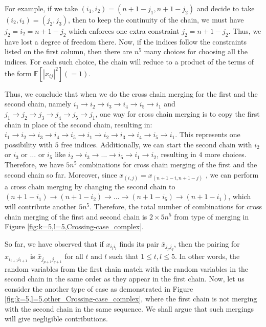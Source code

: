 \documentclass[12pt]{amsart}
\theoremstyle{plain}
\theoremstyle{definition}
\begin{document}
For example, if we take $(i_{1}, i_{2}) = (n+1 - j_{1}, n+1 - j_{2})$ and decide to take $(i_{2}, i_{3}) = (j_{2}, j_{3})$, then to keep the continuity of the chain, we must have $j_{2} = i_{2} = n+1 - j_{2}$ which enforces one extra constraint $j_{2} = n+1 - j_{2}$. Thus, we have lost a degree of freedom there. Now, if the indices follow the constraints listed on the first column, then there are $n^{5}$ many choices for choosing all the indices. For each such choice, the chain will reduce to a product of the terms of the form $\mathbb{E}[|x_{ij}|^{2}] (=1).$ 


Thus, we conclude that when we do the cross chain merging for the first and the second chain, namely $i_{1}\rightarrow i_{2}\rightarrow i_{3}\rightarrow i_{4}\rightarrow  i_{5}\to i_{1}$ and $j_{1}\rightarrow j_{2}\rightarrow j_{3}\rightarrow j_{4} \rightarrow j_{5}\to j_{1}$, one way for cross chain merging is to copy the first chain in place of the second chain, resulting in: $i_{1}\rightarrow i_{2}\rightarrow i_{3}\rightarrow i_{4}\rightarrow  i_{5}\to i_{1}\rightarrow i_{2}\rightarrow i_{3}\rightarrow i_{4}\rightarrow  i_{5}\to i_{1}$. This represents one possibility with $5$ free indices. Additionally, we can start the second chain with $i_{2}$ or $i_{3}$ or $\dots$ or $i_{5}$ like $i_{2}\rightarrow i_{3}\rightarrow \dots \rightarrow i_{5} \rightarrow i_{1}\rightarrow i_{2}$, resulting in $4$ more choices. Therefore, we have $5 n^{5}$ combinations for cross chain merging of the first and the second chain so far. Moreover, since $x_{(i,j)}=x_{(n+1-i,n+1-j)}$ , we can perform a cross chain merging by changing the second chain to $(n+1-i_{1})\rightarrow (n+1-i_{2})\rightarrow \dots \rightarrow (n+1-i_{5})\rightarrow (n+1-i_{1})$, which will contribute another $5n^{5}.$
Therefore, the total number of combinations for cross chain merging of the first and second chain is $2 \times 5n^{5}$ from type of merging in Figure \ref{fig:k=5,l=5,Crossing-case_complex}.

So far, we have observed that if $x_{i_ti_l}$ finds its pair $\bar{x}_{j_pj_q}$, then the pairing for $x_{i_{t+1}i_{l+1}}$ is $\bar{x}_{j_{p+1}j_{q+1}}$ for all $t$ and $l$ such that $1 \leq t, l \leq 5$. In other words, the random variables from the first chain match with the random variables in the second chain in the same order as they appear in the first chain. Now, let us consider the another type of case as demonstrated in Figure \ref{fig:k=5,l=5,other_Crossing-case_complex}, where the first chain is not merging with the second chain in the same sequence. We shall argue that such mergings will give negligible contributions.
\end{document}
